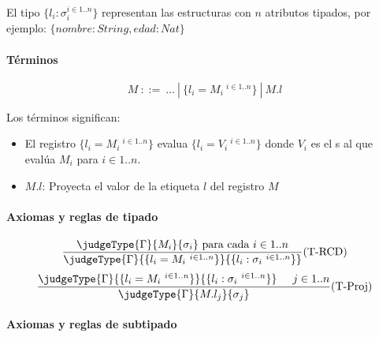 El tipo \(\{l_i : \sigma_i^{i\in 1..n}\}\) representan las estructuras con \(n\) atributos tipados, por ejemplo: \(\{nombre : String,edad:Nat\}\)
\paragraph{Términos}
\[ M~::=~ \dots~|~\{l_i = M_i ~^{i\in 1..n}\}~|~M.l \]

Los términos significan:
\begin{itemize}
	\item El registro \(\{l_i = M_i ~^{i\in 1..n}\}\) evalua \(\{l_i = V_i ~^{i\in 1..n}\}\)  donde \(V_i\) es el s al que evalúa \(M_i\) para \(i\in 1..n\).
	\item \(M.l\): Proyecta el valor de la etiqueta \(l\) del registro \(M\)
\end{itemize}

\paragraph{Axiomas y reglas de tipado}
\begin{equation*}
	\frac{\judgeType{\Gamma}{M_i}{\sigma_i} \text{ para cada } i \in 1..n}{\judgeType{\Gamma}{\{l_i = M_i ~^{i\in 1..n}\}}{\{l_i : \sigma_i ~^{i\in 1..n}\}}}(\text{T-RCD})
\end{equation*}
\vspace*{5mm}
\begin{equation*}
	\frac{\judgeType{\Gamma}{\{l_i = M_i ~^{i\in 1..n}\}}{\{l_i : \sigma_i ~^{i\in 1..n}\}}\hspace*{5mm} j \in 1..n}
	{\judgeType{\Gamma}{M.l_j}{\sigma_j}}(\text{T-Proj})
\end{equation*}

\paragraph{Axiomas y reglas de subtipado}
%

